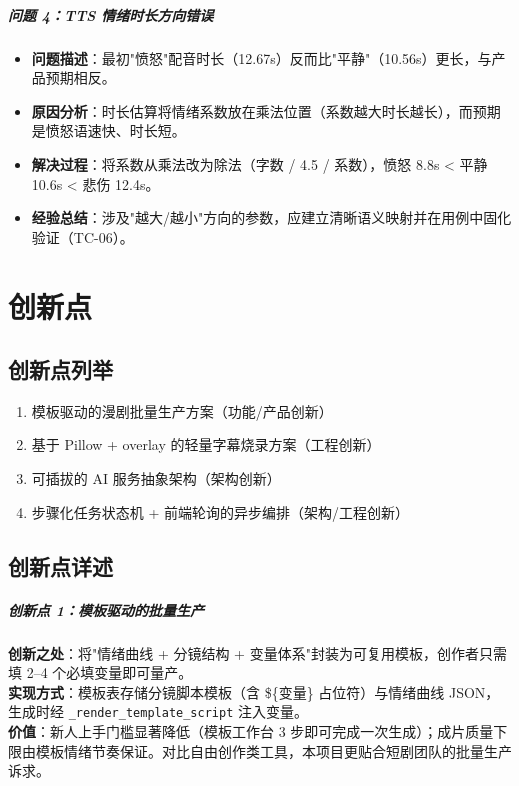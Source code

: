 \documentclass[12pt]{ctexrep}
\begin{document}
\paragraph{问题 4：TTS 情绪时长方向错误}
\begin{itemize}
\item \textbf{问题描述}：最初"愤怒"配音时长（12.67s）反而比"平静"（10.56s）更长，与产品预期相反。
\item \textbf{原因分析}：时长估算将情绪系数放在乘法位置（系数越大时长越长），而预期是愤怒语速快、时长短。
\item \textbf{解决过程}：将系数从乘法改为除法（字数 / 4.5 / 系数），愤怒 8.8s < 平静 10.6s < 悲伤 12.4s。
\item \textbf{经验总结}：涉及"越大/越小"方向的参数，应建立清晰语义映射并在用例中固化验证（TC-06）。
\end{itemize}

\chapter{创新点}
\section{创新点列举}

\begin{enumerate}
\item 模板驱动的漫剧批量生产方案（功能/产品创新）
\item 基于 Pillow + overlay 的轻量字幕烧录方案（工程创新）
\item 可插拔的 AI 服务抽象架构（架构创新）
\item 步骤化任务状态机 + 前端轮询的异步编排（架构/工程创新）
\end{enumerate}

\section{创新点详述}

\paragraph{创新点 1：模板驱动的批量生产}
\textbf{创新之处}：将"情绪曲线 + 分镜结构 + 变量体系"封装为可复用模板，创作者只需填 2--4 个必填变量即可量产。\\
\textbf{实现方式}：模板表存储分镜脚本模板（含 \$\{变量\} 占位符）与情绪曲线 JSON，生成时经 \texttt{\_render\_template\_script} 注入变量。\\
\textbf{价值}：新人上手门槛显著降低（模板工作台 3 步即可完成一次生成）；成片质量下限由模板情绪节奏保证。对比自由创作类工具，本项目更贴合短剧团队的批量生产诉求。
\end{document}

